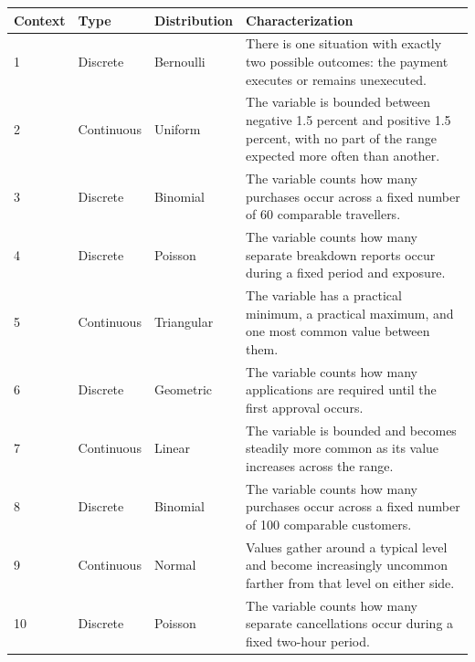 	\begin{center}
		\begin{tabularx}{\textwidth}{|C{1.2cm}|C{2.3cm}|C{2.5cm}|>{\raggedright\arraybackslash}X|}
			\hline
			\textbf{Context} &
			\textbf{Type} &
			\textbf{Distribution} &
			\textbf{Characterization} \\
			\hline
			
			1 &
			Discrete &
			Bernoulli &
			There is one situation with exactly two possible outcomes: the payment executes or remains unexecuted. \\
			\hline
			
			2 &
			Continuous &
			Uniform &
			The variable is bounded between negative 1.5 percent and positive 1.5 percent, with no part of the range expected more often than another. \\
			\hline
			
			3 &
			Discrete &
			Binomial &
			The variable counts how many purchases occur across a fixed number of 60 comparable travellers. \\
			\hline
			
			4 &
			Discrete &
			Poisson &
			The variable counts how many separate breakdown reports occur during a fixed period and exposure. \\
			\hline
			
			5 &
			Continuous &
			Triangular &
			The variable has a practical minimum, a practical maximum, and one most common value between them. \\
			\hline
			
			6 &
			Discrete &
			Geometric &
			The variable counts how many applications are required until the first approval occurs. \\
			\hline
			
			7 &
			Continuous &
			Linear &
			The variable is bounded and becomes steadily more common as its value increases across the range. \\
			\hline
			
			8 &
			Discrete &
			Binomial &
			The variable counts how many purchases occur across a fixed number of 100 comparable customers. \\
			\hline
			
			9 &
			Continuous &
			Normal &
			Values gather around a typical level and become increasingly uncommon farther from that level on either side. \\
			\hline
			
			10 &
			Discrete &
			Poisson &
			The variable counts how many separate cancellations occur during a fixed two-hour period. \\
			\hline
			
		\end{tabularx}
	\end{center}
	
